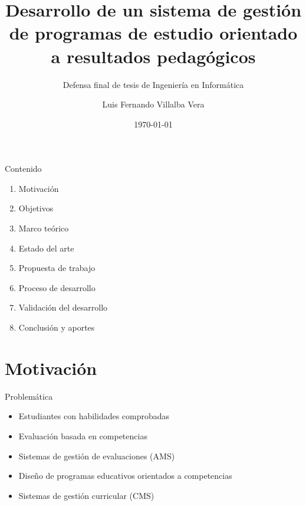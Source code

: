 \documentclass[10pt,xcolor=table]{beamer}
\title{Desarrollo de un sistema de gestión de programas de estudio orientado a resultados pedagógicos}
\subtitle{Defensa final de tesis de Ingeniería en Informática}
\author{Luis Fernando Villalba Vera}
\institute{Universidad Católica - Nuestra Señora de la Asunción}
\date{\today}
\begin{document}
\maketitle

\begin{frame}{Contenido}
	\begin{enumerate}
	    \item Motivación
	    \item Objetivos
	    \item Marco teórico
	    \item Estado del arte
	    \item Propuesta de trabajo
	    \item Proceso de desarrollo
	    \item Validación del desarrollo
	    \item Conclusión y aportes
	 \end{enumerate}
\end{frame}

\section{Motivación}
\begin{frame}{Problemática}
  \begin{itemize}[<+- | alert@+>]
    \item Estudiantes con habilidades comprobadas
    \item Evaluación basada en competencias
    \item Sistemas de gestión de evaluaciones (AMS)
    \item Diseño de programas educativos orientados a competencias
    \item Sistemas de gestión curricular (CMS)
  \end{itemize}
\end{frame}
\end{document}
